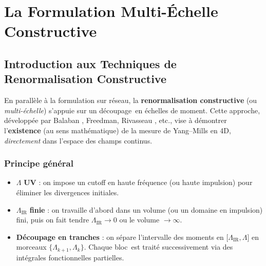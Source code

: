 \chapter{La Formulation Multi-Échelle Constructive}
\label{chap:5}

\section{Introduction aux Techniques de Renormalisation Constructive}
\label{sec:5.1}

En parallèle à la formulation sur réseau, la \textbf{renormalisation constructive} (ou \textit{multi-échelle}) s’appuie sur un \og découpage\fg\ en échelles de moment. Cette approche, développée par Balaban \cite{Balaban1982-1,Balaban1982-2}, Freedman, Rivasseau \cite{Rivasseau1991}, etc., vise à démontrer l’\textbf{existence} (au sens mathématique) de la mesure de Yang--Mills en 4D, \emph{directement} dans l’espace des champs continus.

\subsection*{Principe général}
\begin{itemize}
	\item \(\Lambda\) \textbf{UV} : on impose un cutoff en haute fréquence (ou haute impulsion) pour éliminer les divergences initiales.  
	\item \(\Lambda_{\mathrm{IR}}\) \textbf{finie} : on travaille d’abord dans un volume (ou un domaine en impulsion) fini, puis on fait tendre \(\Lambda_{\mathrm{IR}} \to 0\) ou le volume \(\to \infty\).  
	\item \textbf{Découpage en tranches} : on sépare l’intervalle des moments en \(\bigl[\Lambda_{\mathrm{IR}}, \Lambda\bigr]\) en morceaux \(\{\Lambda_{k+1},\Lambda_{k}\}\). Chaque \og bloc\fg\ est traité successivement via des intégrales fonctionnelles partielles.
\end{itemize}

